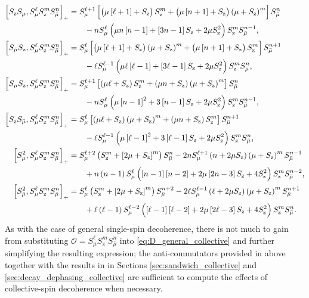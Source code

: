 \documentclass[aps,notitlepage,nofootinbib,11pt]{revtex4-1}
\newcommand{\p}[1]{\left(#1\right)} %
\renewcommand{\sp}[1]{\left[#1\right]} %
\renewcommand{\O}{\mathcal{O}}
\newcommand{\z}{\text{z}}
\newcommand{\bmu}{{\bar\mu}}
\newcommand{\1}{\mathds{1}}
\begin{document}
\begin{align}
  \sp{S_\z S_\mu, S_\mu^\ell S_\z^m S_\bmu^n}_+
  &= S_\mu^{\ell+1} \sp{\p{\mu\sp{\ell+1} + S_\z} S_\z^m
    + \p{\mu\sp{n+1} + S_\z} \p{\mu+S_\z}^m } S_\bmu^n \notag \\
  &\qquad - n S_\mu^\ell \p{\mu n \sp{n-1}
    + \sp{3n-1} S_\z + 2\mu S_\z^2} S_\z^m S_\bmu^{n-1},
  \allowdisplaybreaks \\
  \sp{S_\bmu S_\z, S_\mu^\ell S_\z^m S_\bmu^n}_+
  &= S_\mu^\ell \sp{\p{\mu\sp{\ell+1} + S_\z} \p{\mu+S_\z}^m
    + \p{\mu\sp{n+1} + S_\z} S_\z^m } S_\bmu^{n+1} \notag \\
  &\qquad - \ell S_\mu^{\ell-1} \p{\mu \ell \sp{\ell-1}
    + \sp{3\ell-1} S_\z + 2\mu S_\z^2} S_\z^m S_\bmu^n,
  \allowdisplaybreaks \\
  \sp{S_\mu S_\z, S_\mu^\ell S_\z^m S_\bmu^n}_+
  &= S_\mu^{\ell+1} \sp{\p{\mu\ell+S_\z} S_\z^m
    + \p{\mu n+S_\z} \p{\mu+S_\z}^m} S_\bmu^n \notag \\
  &\qquad - n S_\mu^\ell \p{\mu\sp{n-1}^2
    + 3\sp{n-1} S_\z + 2\mu S_\z^2} S_\z^m S_\bmu^{n-1},
  \allowdisplaybreaks \\
  \sp{S_\z S_\bmu, S_\mu^\ell S_\z^m S_\bmu^n}_+
  &= S_\mu^\ell \sp{\p{\mu\ell+S_\z} \p{\mu+S_\z}^m
    + \p{\mu n+S_\z} S_\z^m} S_\bmu^{n+1} \notag \\
  &\qquad - \ell S_\mu^{\ell-1} \p{\mu\sp{\ell-1}^2
    + 3\sp{\ell-1} S_\z + 2\mu S_\z^2} S_\z^m S_\bmu^n,
  \allowdisplaybreaks \\
  \sp{S_\mu^2, S_\mu^\ell S_\z^m S_\bmu^n}_+
  &= S_\mu^{\ell+2} \p{S_\z^m+\sp{2\mu+S_\z}^m} S_\bmu^n
  - 2n S_\mu^{\ell+1} \p{n+2\mu S_\z} \p{\mu+S_\z}^m S_\bmu^{n-1}
  \notag \\
  &\qquad + n\p{n-1} S_\mu^\ell \p{\sp{n-1}\sp{n-2}
    + 2\mu\sp{2n-3} S_\z + 4 S_\z^2} S_\z^m S_\bmu^{n-2},
  \allowdisplaybreaks \\
  \sp{S_\bmu^2, S_\mu^\ell S_\z^m S_\bmu^n}_+
  &= S_\mu^\ell \p{S_\z^m+\sp{2\mu+S_\z}^m} S_\bmu^{n+2}
  - 2\ell S_\mu^{\ell-1} \p{\ell+2\mu S_\z} \p{\mu+S_\z}^m S_\bmu^{n+1}
  \notag \\
  &\qquad + \ell\p{\ell-1} S_\mu^{\ell-2} \p{\sp{\ell-1}\sp{\ell-2}
    + 2\mu\sp{2\ell-3} S_\z + 4 S_\z^2} S_\z^m S_\bmu^n.
\end{align}
As with the case of general single-spin decoherence, there is not much
to gain from substituting $\O = S_\mu^\ell S_\z^m S_\bmu^n$ into
\eqref{eq:D_general_collective} and further simplifying the resulting
expression; the anti-commutators provided in above together with the
results in in Sections \ref{sec:sandwich_collective} and
\ref{sec:decay_dephasing_collective} are sufficient to compute the
effects of collective-spin decoherence when necessary.
\end{document}
